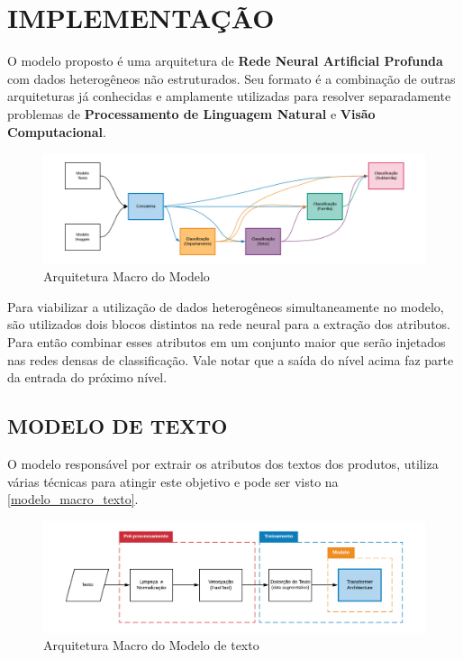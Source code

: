 \chapter{IMPLEMENTAÇÃO}

O modelo proposto é uma arquitetura de \textbf{Rede Neural Artificial Profunda} com dados heterogêneos não estruturados. Seu formato é a combinação de outras arquiteturas já conhecidas e amplamente utilizadas para resolver separadamente problemas de \textbf{Processamento de Linguagem Natural} e \textbf{Visão Computacional}.

\begin{figure}[!h]
	\caption{\label{arquitetura_macro_do_modelo} Arquitetura Macro do Modelo}
	\begin{center}
	    \includegraphics[width=\textwidth]{artigo/recursos/imagens/arquitetura_macro_do_modelo.png}
	\end{center}
\end{figure}

Para viabilizar a utilização de dados heterogêneos simultaneamente no modelo, são utilizados dois blocos distintos na rede neural para a extração dos atributos. Para então combinar esses atributos em um conjunto maior que serão injetados nas redes densas de classificação. Vale notar que a saída do nível acima faz parte da entrada do próximo nível.

\section{MODELO DE TEXTO}

O modelo responsável por extrair os atributos dos textos dos produtos, utiliza várias técnicas para atingir este objetivo e pode ser visto na \autoref{modelo_macro_texto}.

\begin{figure}[]
	\caption{\label{modelo_macro_texto} Arquitetura Macro do Modelo de texto}
	\begin{center}
	    \includegraphics[width=\textwidth]{artigo/recursos/imagens/modelo_macro_texto.png}
	\end{center}
\end{figure}

